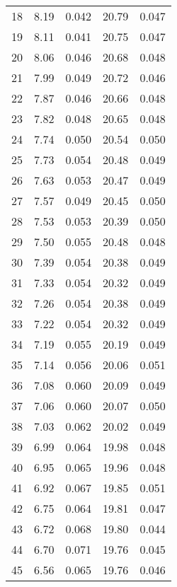 \begin{table}
\begin{tabular}{c|ll|ll}
18 & 8.19 & 0.042 & 20.79 & 0.047 \\
19 & 8.11 & 0.041 & 20.75 & 0.047 \\
20 & 8.06 & 0.046 & 20.68 & 0.048 \\
21 & 7.99 & 0.049 & 20.72 & 0.046 \\
22 & 7.87 & 0.046 & 20.66 & 0.048 \\
23 & 7.82 & 0.048 & 20.65 & 0.048 \\
24 & 7.74 & 0.050 & 20.54 & 0.050 \\
25 & 7.73 & 0.054 & 20.48 & 0.049 \\
26 & 7.63 & 0.053 & 20.47 & 0.049 \\
27 & 7.57 & 0.049 & 20.45 & 0.050 \\
28 & 7.53 & 0.053 & 20.39 & 0.050 \\
29 & 7.50 & 0.055 & 20.48 & 0.048 \\
30 & 7.39 & 0.054 & 20.38 & 0.049 \\
31 & 7.33 & 0.054 & 20.32 & 0.049 \\
32 & 7.26 & 0.054 & 20.38 & 0.049 \\
33 & 7.22 & 0.054 & 20.32 & 0.049 \\
34 & 7.19 & 0.055 & 20.19 & 0.049 \\
35 & 7.14 & 0.056 & 20.06 & 0.051 \\
36 & 7.08 & 0.060 & 20.09 & 0.049 \\
37 & 7.06 & 0.060 & 20.07 & 0.050 \\
38 & 7.03 & 0.062 & 20.02 & 0.049 \\
39 & 6.99 & 0.064 & 19.98 & 0.048 \\
40 & 6.95 & 0.065 & 19.96 & 0.048 \\
41 & 6.92 & 0.067 & 19.85 & 0.051 \\
42 & 6.75 & 0.064 & 19.81 & 0.047 \\
43 & 6.72 & 0.068 & 19.80 & 0.044 \\
44 & 6.70 & 0.071 & 19.76 & 0.045 \\
45 & 6.56 & 0.065 & 19.76 & 0.046 \\
               \hline
        \end{tabular}
    \end{table}
    \clearpage

